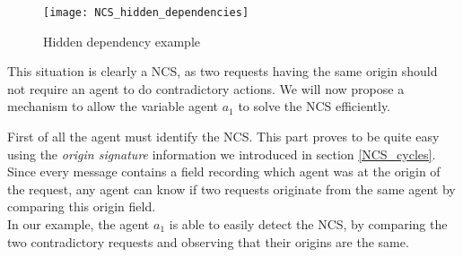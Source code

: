 \begin{figure}
\centering
\texttt{[image: NCS\_hidden\_dependencies]}
\caption{Hidden dependency example}\label{NCS_hidden_dependencies}
\end{figure}

This situation is clearly a NCS, as two requests having the same origin should not require an agent to do contradictory actions. We will now propose a mechanism to allow the variable agent $a_1$ to solve the NCS efficiently.

First of all the agent must identify the NCS. This part proves to be quite easy using the \emph{origin signature} information we introduced in section \ref{NCS_cycles}. Since every message contains a field recording which agent was at the origin of the request, any agent can know if two requests originate from the same agent by comparing this origin field.\\
In our example, the agent $a_1$ is able to easily detect the NCS, by comparing the two contradictory requests and observing that their origins are the same.

